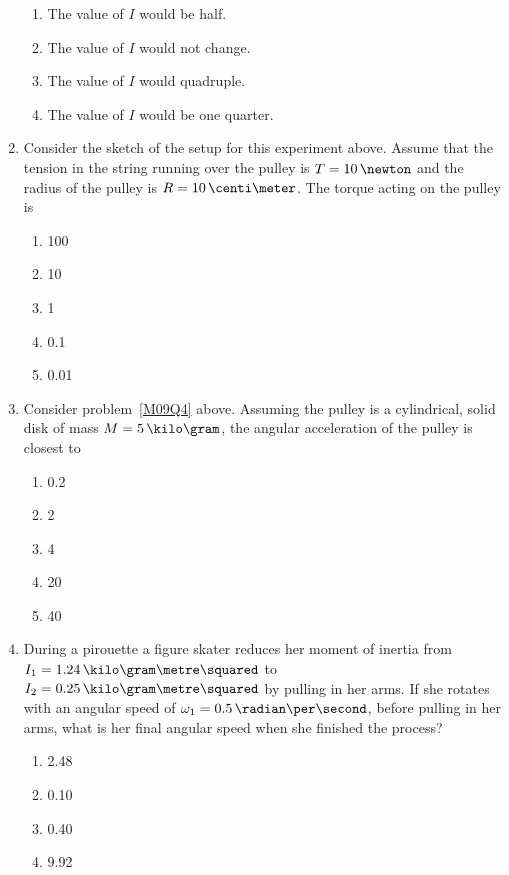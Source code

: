 \begin{enumerate}
\begin{enumerate}
  \item The value of $I$ would be half.
  \item The value of $I$ would not change.
  \item The value of $I$ would quadruple.
  \item The value of $I$ would be one quarter.
  \end{enumerate}
\item \label{M09Q4} Consider the sketch of the setup for this experiment above. Assume that the tension in the string running over the pulley is $T = 10\,\newton$ and the radius of the pulley is $R = 10\,\centi\meter$. The torque acting on the pulley is
  \begin{enumerate}
  \item   100\,\newton\metre
  \item    10\,\newton\metre
  \item     1\,\newton\metre
  \item   0.1\,\newton\metre
  \item  0.01\,\newton\metre
  \end{enumerate}
\item Consider problem~\ref{M09Q4} above. Assuming the pulley is a cylindrical, solid disk of mass $M = 5\,\kilo\gram$, the angular acceleration of the pulley is closest to
  \begin{enumerate}
  \item 0.2\,\radian\per\second\squared
  \item 2  \,\radian\per\second\squared
  \item 4  \,\radian\per\second\squared
  \item 20 \,\radian\per\second\squared
  \item 40 \,\radian\per\second\squared
  \end{enumerate}
\item During a pirouette a figure skater reduces her moment of inertia from $I_1 = 1.24\,\kilo\gram\metre\squared$ to $I_2 = 0.25\,\kilo\gram\metre\squared$ by pulling in her arms. If she rotates with an angular speed of $\omega_1 = 0.5\,\radian\per\second$, before pulling in her arms, what is her final angular speed when she finished the process?
  \begin{enumerate}
  \item  2.48\,\radian\per\second
  \item  0.10\,\radian\per\second
  \item  0.40\,\radian\per\second
  \item  9.92\,\radian\per\second

\end{enumerate}
\end{enumerate}
